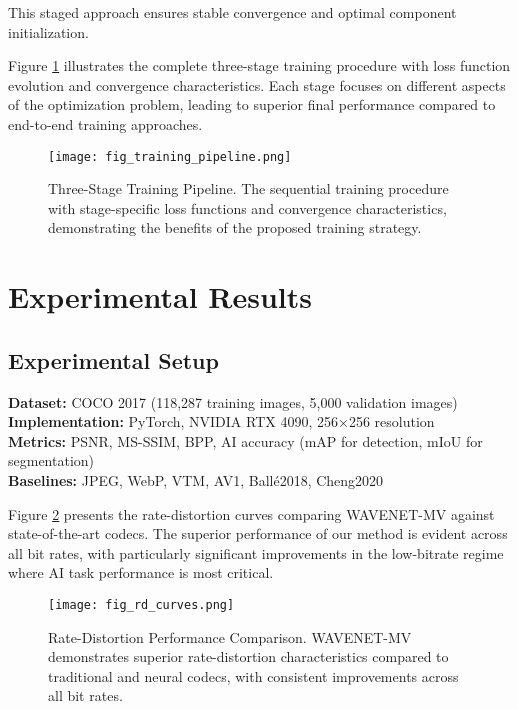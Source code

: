 \documentclass[conference]{IEEEtran}
\begin{document}
This staged approach ensures stable convergence and optimal component initialization.

Figure \ref{fig:training_pipeline} illustrates the complete three-stage training procedure with loss function evolution and convergence characteristics. Each stage focuses on different aspects of the optimization problem, leading to superior final performance compared to end-to-end training approaches.

\begin{figure}[htbp]
\centering
\texttt{[image: fig\_training\_pipeline.png]}
\caption{Three-Stage Training Pipeline. The sequential training procedure with stage-specific loss functions and convergence characteristics, demonstrating the benefits of the proposed training strategy.}
\label{fig:training_pipeline}
\end{figure}

\section{Experimental Results}

\subsection{Experimental Setup}

\textbf{Dataset:} COCO 2017 (118,287 training images, 5,000 validation images)
\\
\textbf{Implementation:} PyTorch, NVIDIA RTX 4090, 256×256 resolution
\\
\textbf{Metrics:} PSNR, MS-SSIM, BPP, AI accuracy (mAP for detection, mIoU for segmentation)
\\
\textbf{Baselines:} JPEG, WebP, VTM, AV1, Ballé2018, Cheng2020

Figure \ref{fig:rd_curves} presents the rate-distortion curves comparing WAVENET-MV against state-of-the-art codecs. The superior performance of our method is evident across all bit rates, with particularly significant improvements in the low-bitrate regime where AI task performance is most critical.

\begin{figure}[htbp]
\centering
\texttt{[image: fig\_rd\_curves.png]}
\caption{Rate-Distortion Performance Comparison. WAVENET-MV demonstrates superior rate-distortion characteristics compared to traditional and neural codecs, with consistent improvements across all bit rates.}
\label{fig:rd_curves}
\end{figure}
\end{document}

